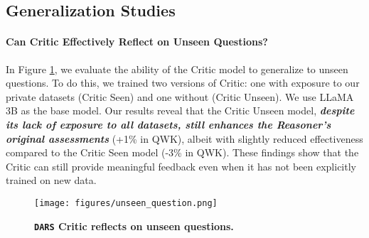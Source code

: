 \subsection{Generalization Studies}



\paragraph{Can Critic Effectively Reflect on Unseen Questions?} In Figure \ref{fig:unseen_question}, we evaluate the ability of the Critic model to generalize to unseen questions. To do this, we %
trained two versions of Critic: one with exposure to our private datasets (Critic Seen) and one without (Critic Unseen). We use LLaMA 3B as the base model. Our results reveal that the Critic Unseen model, \textbf{\emph{despite its lack of exposure to all datasets, still enhances the Reasoner’s original assessments}} (+1\% in QWK), albeit with slightly reduced effectiveness compared to the Critic Seen model (-3\% in QWK). These findings show that %
the Critic can still provide meaningful feedback even when it has not been explicitly trained on new data.%
\begin{figure}[!h]
\centering
\vspace{-2mm}
\texttt{[image: figures/unseen\_question.png]}
\vspace{-2mm}
\caption{\small \textbf{\texttt{DARS} Critic reflects on unseen questions.}}
\label{fig:unseen_question}\vspace{-6mm}
\end{figure}


